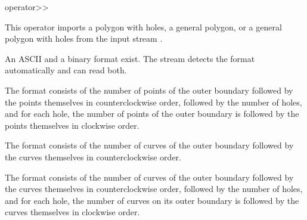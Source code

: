 
\ccHtmlNoClassLinks
\begin{ccRefFunction}{operator>>}
\label{refPolygon_with_holes_operator_rightshift}

\ccDefinition

This operator imports a polygon with holes, a general polygon, or a general 
polygon with holes from the input stream .

An ASCII and a binary format exist. The stream detects the
format automatically and can read both.

The format consists of the number of points of the outer boundary followed 
by the points themselves in counterclockwise order, followed by the number of holes,
and for each hole, the number of points of the outer boundary is followed 
by the points themselves in clockwise order.


The format consists of the number of curves of the outer boundary followed
by the curves themselves in counterclockwise order.


The format consists of the number of curves of the outer boundary followed 
by the curves themselves in counterclockwise order, followed by the number of holes,
and for each hole, the number of curves on its outer boundary is 
followed by the curves themselves in clockwise order.

\ccSeeAlso

\\ 
\\ 
\\ 


\end{ccRefFunction}

